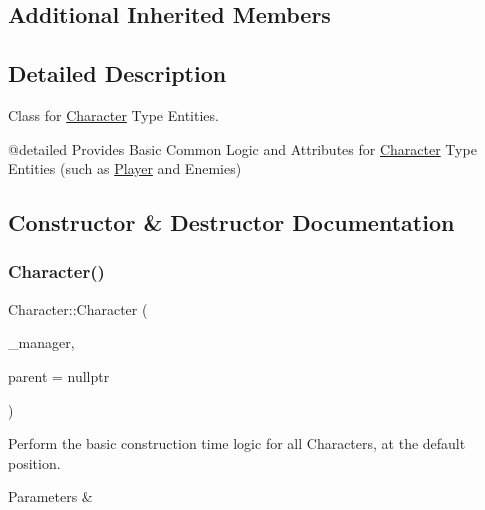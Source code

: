 \subsection*{Additional Inherited Members}


\subsection{Detailed Description}
Class for \mbox{\hyperlink{class_character}{Character}} Type Entities. 

@detailed Provides Basic Common Logic and Attributes for \mbox{\hyperlink{class_character}{Character}} Type Entities (such as \mbox{\hyperlink{class_player}{Player}} and Enemies) 

\subsection{Constructor \& Destructor Documentation}
\mbox{\label{class_character_ad6234cbdd8a67b0fd74289c725ad4395}} 
\subsubsection{\texorpdfstring{Character()}{Character()}\hspace{0.1cm}{\footnotesize\ttfamily [1/3]}}
{\footnotesize\ttfamily Character\+::\+Character (\begin{DoxyParamCaption}\item[{\mbox{\hyperlink{class_game_manager}{Game\+Manager}} $\ast$}]{\+\_\+manager,  }\item[{\mbox{\hyperlink{class_game_entity}{Game\+Entity}} $\ast$}]{parent = {\ttfamily nullptr} }\end{DoxyParamCaption})\hspace{0.3cm}{\ttfamily [protected]}}



Perform the basic construction time logic for all Characters, at the default position. 


\begin{DoxyParams}{Parameters}
{\em } & \\
\hline
\end{DoxyParams}
\mbox{\label{class_character_a940ba50598ff17e5b1040545d61c9328}} 
